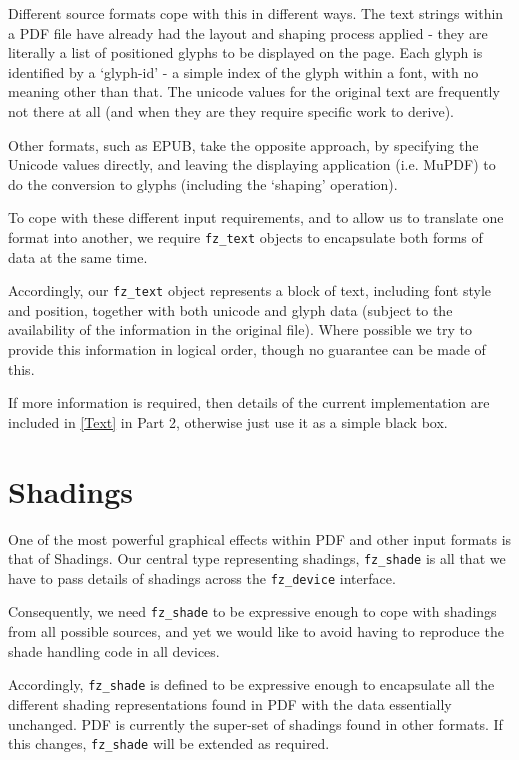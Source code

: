 \documentclass[oneside]{book}
\newcommand{\rjwref}[1] {\autoref{#1} \nameref{#1}}
\begin{document}
Different source formats cope with this in different ways. The text strings within a PDF file have already had the layout and shaping process applied - they are literally a list of positioned glyphs to be displayed on the page. Each glyph is identified by a `glyph-id' - a simple index of the glyph within a font, with no meaning other than that. The unicode values for the original text are frequently not there at all (and when they are they require specific work to derive).

Other formats, such as EPUB, take the opposite approach, by specifying the Unicode values directly, and leaving the displaying application (i.e. MuPDF) to do the conversion to glyphs (including the `shaping' operation).

To cope with these different input requirements, and to allow us to translate one format into another, we require \texttt{fz\_text} objects to encapsulate both forms of data at the same time.

Accordingly, our \texttt{fz\_text} object represents a block of text, including font style and position, together with both unicode and glyph data (subject to the availability of the information in the original file). Where possible we try to provide this information in logical order, though no guarantee can be made of this.

If more information is required, then details of the current implementation are included in \rjwref{Text} in Part 2, otherwise just use it as a simple black box.

\section{Shadings}
\label{ShadingsOverview}

One of the most powerful graphical effects within PDF and other input formats is that of Shadings. Our central type representing shadings, \texttt{fz\_shade} is all that we have to pass details of shadings across the \texttt{fz\_device} interface.

Consequently, we need \texttt{fz\_shade} to be expressive enough to cope with shadings from all possible sources, and yet we would like to avoid having to reproduce the shade handling code in all devices.

Accordingly, \texttt{fz\_shade} is defined to be expressive enough to encapsulate all the different shading representations found in PDF with the data essentially unchanged. PDF is currently the super-set of shadings found in other formats. If this changes, \texttt{fz\_shade} will be extended as required.
\end{document}
